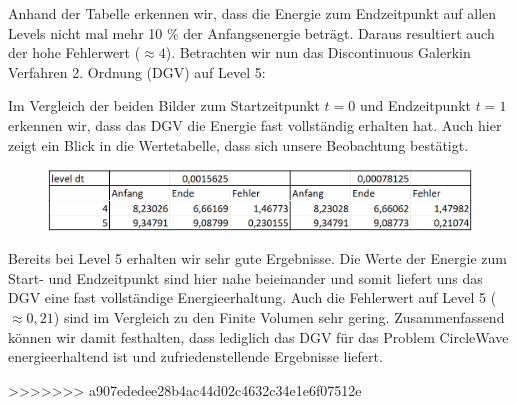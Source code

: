 Anhand der Tabelle erkennen wir, dass die Energie zum Endzeitpunkt auf allen Levels nicht mal mehr 10 \% der Anfangsenergie beträgt. Daraus resultiert auch der hohe Fehlerwert ($\approx 4$). 
Betrachten wir nun das Discontinuous Galerkin Verfahren 2. Ordnung (DGV) auf Level 5:

\begin{figure}[H]
	\centering
\end{figure}

Im Vergleich der beiden Bilder zum Startzeitpunkt $t=0$ und Endzeitpunkt $t=1$ erkennen wir, dass das DGV die Energie fast vollständig erhalten hat. Auch hier zeigt ein Blick in die Wertetabelle, dass sich unsere Beobachtung bestätigt.

\begin{figure}[H]
	\centering
	\includegraphics[width=\textwidth]{../Aufgabe21/deg=2CircleWaveEnergieTabelle.png}
\end{figure}

Bereits bei Level 5 erhalten wir sehr gute Ergebnisse.
Die Werte der Energie zum Start- und Endzeitpunkt sind hier nahe beieinander und somit liefert uns das DGV eine fast vollständige Energieerhaltung. Auch die Fehlerwert auf Level 5 ($\approx 0,21$) sind im Vergleich zu den Finite Volumen sehr gering. Zusammenfassend können wir damit festhalten, dass lediglich das DGV für das Problem CircleWave energieerhaltend ist und zufriedenstellende Ergebnisse liefert.





>>>>>>> a907ededee28b4ac44d02c4632c34e1e6f07512e
